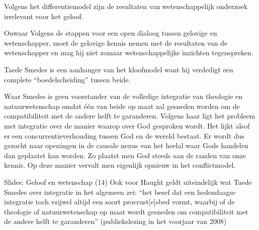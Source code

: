 \documentclass[main.tex]{subfiles}
\begin{document}
\begin{examenvraag}
    \begin{stelling}
        Volgens het differentiemodel zijn de resultaten van wetenschappelijk onderzoek irrelevant voor het geloof.
    \end{stelling}

    \begin{stelling-antwoord}{Onwaar}
    	Volgens de stappen voor een open dialoog tussen gelovige en wetenschapper, moet de gelovige kennis nemen met de resultaten van de wetenschapper en mag hij niet zomaar wetenschappelijke inzichten tegenspreken.
  	\end{stelling-antwoord}
\end{examenvraag}


\begin{examenvraag}
    \begin{stelling}
        Taede Smedes is een aanhanger van het kloofmodel want hij verdedigt een complete “boedelscheiding” tussen beide.
    \end{stelling}

	\begin{stelling-antwoord}{Waar}
    	Smedes is geen voorstander van de volledige integratie van theologie 
    	en natuurwetenschap omdat één van beide op maat zal gesneden worden 
    	om de compatibiliteit met de andere helft te garanderen.‭ ‬Volgens haar 
    	ligt het probleem met integratie over de manier waarop over God 
    	gesproken wordt.‭ ‬Het lijkt alsof er een concurrentieverhouding tussen 
    	God en de wereld bestaat.‭ ‬Er wordt dus gezocht naar openingen in de 
    	causale nexus van het heelal waar Gods handelen dan geplaatst kan 
    	worden.‭ ‬Zo plaatst men God steeds aan de randen van onze kennis.‭ ‬Op 
    	deze manier vervalt men eigenlijk opnieuw in het conflictmodel.
    	
    	\begin{citaat}{Slides: Geloof en wetenschap (14)}
    	Ook voor Haught geldt uiteindelijk wat Taede Smedes
		over integratie in het algemeen zei: “het besef dat een
		hedendaagse integratie toch vrijwel altijd een soort
		procrust[e]sbed vormt, waarbij of de theologie of
		natuurwetenschap op maat wordt gesneden om
		compatibiliteit met de andere helft te garanderen”
		(publiekslezing in het voorjaar van 2008)
    	\end{citaat}
  	\end{stelling-antwoord}

\end{examenvraag}
\end{document}
